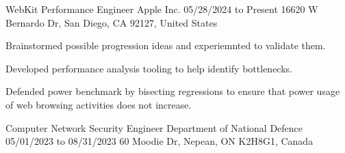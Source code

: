

\begin{cventries}

  \cventry
    {WebKit Performance Engineer} %
    {Apple Inc.} %
    {05/28/2024 to Present} %
    {16620 W Bernardo Dr, San Diego, CA 92127, United States} %
    {
      \begin{cvitems} %
        \item{Brainstormed possible progression ideas and experiemnted to validate them.}
        \item{Developed performance analysis tooling to help identify bottlenecks.}
        \item{Defended power benchmark by bisecting regressions to ensure that power usage of web browsing activities does not increase.}
      \end{cvitems}
    }
  \cventry
    {Computer Network Security Engineer} %
    {Department of National Defence} %
    {05/01/2023 to 08/31/2023} %
    {60 Moodie Dr, Nepean, ON K2H8G1, Canada} %
    {
      \begin{cvitems} %

\end{cvitems}}
\end{cventries}
